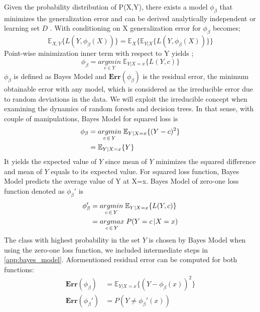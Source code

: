 Given the probability distribution of P(X,Y), there exists a model $\phi_{\beta}$ that minimizes the generalization error 
and can be derived analytically independent or learning set $D$ \cite{louppe2014understanding}. 
With conditioning on X generalization error for $\phi_{\beta}$ becomes;
\begin{equation}
\mathbb{E}_{X,Y} \{L(Y, \phi_{\beta}(X))\} = \mathbb{E}_{X}\{\mathbb{E}_{Y|X}\{L(Y, \phi_{\beta}(X)) \} \}
\end{equation}
Point-wise minimization inner term  with respect to Y yields \cite{louppe2014understanding};
\begin{equation}
\phi_{\beta} = \underset{c \in Y}{argmin} \; \mathbb{E}_{Y|X=x}\{L(Y,c)\}
\end{equation}
$\phi_{\beta}$ is defined as Bayes Model and $\boldsymbol{Err}(\phi_{\beta})$ is the residual error, 
the minimum obtainable error with any model, which is considered as the irreducible error due to random deviations in the 
data\cite{louppe2014understanding}. We will exploit the irreducible concept when examining the dynamics of random forests and 
decision trees. In that sense, with couple of manipulations, Bayes Model for squared loss is
\begin{align}
\phi_{\beta} & = \underset{c \,\in\, Y}{argmin} \; \mathbb{E}_{Y|X=x}\{(Y-c)^2 \} \notag\\
			 & = \mathbb{E}_{Y|X=x}\{Y\}
\end{align}
It yields the expected value of $Y$ since mean of $Y$ minimizes the squared difference 
and mean of $Y$ equals to its expected value.
For squared loss function, Bayes Model predicts the average value of Y at X=x. 
Bayes Model of zero-one loss function denoted as $\phi_{\beta}'$ is
\begin{align}\label{eq:bayes_model}
\phi_{\beta}' & = \underset{c \,\in\, Y}{argmin} \; \mathbb{E}_{Y|X=x}\{L(Y,c) \} \notag\\
			 & = \underset{c \,\in\, Y}{argmax} \; P(Y = c \,| X = x)
\end{align}
The class with highest probability in the set $Y$ is chosen by Bayes Model when using the zero-one loss function, 
we included intermediate steps in \autoref{app:bayes_model}. 
Aformentioned residual error can be computed for both functions:
\begin{align}
\boldsymbol{Err}(\phi_{\beta}) & = \mathbb{E}_{Y|X=x}\{(Y-\phi_{\beta}(x))^2 \}\\
\boldsymbol{Err}(\phi_{\beta}') & = P(Y \neq \phi_{\beta}'(x) )
\end{align}
